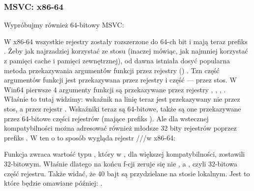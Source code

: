 \subsubsection{MSVC: x86-64}

Wypróbujmy również 64-bitowy MSVC:




W x86-64 wszystkie rejestry zostały rozszerzone do 64-ch bit i mają teraz prefiks .
Żeby jak najrzadziej korzystać ze stosu (inaczej mówiąc, jak najmniej korzystać z pamięci cache i pamięci zewnętrznej), od dawna istniała dosyć popularna metoda przekazywania argumentów funkcji przez rejestry () .
Tzn część argumentów funkcji jest przekazywana przez rejestry i część --- przez stos.
W Win64 pierwsze 4 argumenty funkcji są przekazywane przez rejestry \RCX, \RDX, , .
Właśnie to tutaj widzimy: wskaźnik na linię \printf teraz jest przekazywany nie przez stos, a przez rejestr \RCX.
Wskaźniki teraz są 64-bitowe, także są one przekazywane przez 64-bitowe części rejestrów (mające prefiks ).
Ale dla wstecznej kompatybilności można adresować również młodsze 32 bity rejestrów poprzez prefiks .
W ten o to sposób wygląda rejestr \RAX/\EAX/\AX/\AL w x86-64:


Funkcja \main zwraca wartość typu \Tint, który w \CCpp, dla większej kompatybilności,
zostawili 32-bitowym. Właśnie dlatego na końcu f-cji \main zeruje się nie \RAX, a \EAX, czyli 32-bitowa część rejestru.
Także widać, że 40 bajt są przydzielane na stosie lokalnym.
Jest to  które będzie omawiane później: .

